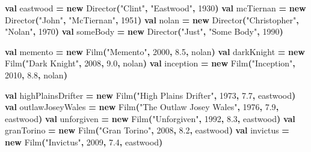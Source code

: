 \documentclass[11pt,a5paper,]{book}
\newenvironment{Shaded}{\begin{snugshade}}{\end{snugshade}}
\newcommand{\DecValTok}[1]{\textcolor[rgb]{0.00,0.00,0.81}{#1}}
\newcommand{\FloatTok}[1]{\textcolor[rgb]{0.00,0.00,0.81}{#1}}
\newcommand{\FunctionTok}[1]{\textcolor[rgb]{0.00,0.00,0.00}{#1}}
\newcommand{\KeywordTok}[1]{\textcolor[rgb]{0.13,0.29,0.53}{\textbf{#1}}}
\newcommand{\NormalTok}[1]{#1}
\newcommand{\OperatorTok}[1]{\textcolor[rgb]{0.81,0.36,0.00}{\textbf{#1}}}
\newcommand{\StringTok}[1]{\textcolor[rgb]{0.31,0.60,0.02}{#1}}
\begin{document}
\begin{Shaded}
\begin{Highlighting}[]
\KeywordTok{val}\NormalTok{ eastwood          }\OperatorTok{=} \KeywordTok{new} \FunctionTok{Director}\OperatorTok{(}\StringTok{"Clint"}\OperatorTok{,} \StringTok{"Eastwood"}\OperatorTok{,} \DecValTok{1930}\OperatorTok{)}
\KeywordTok{val}\NormalTok{ mcTiernan         }\OperatorTok{=} \KeywordTok{new} \FunctionTok{Director}\OperatorTok{(}\StringTok{"John"}\OperatorTok{,} \StringTok{"McTiernan"}\OperatorTok{,} \DecValTok{1951}\OperatorTok{)}
\KeywordTok{val}\NormalTok{ nolan             }\OperatorTok{=} \KeywordTok{new} \FunctionTok{Director}\OperatorTok{(}\StringTok{"Christopher"}\OperatorTok{,} \StringTok{"Nolan"}\OperatorTok{,} \DecValTok{1970}\OperatorTok{)}
\KeywordTok{val}\NormalTok{ someBody          }\OperatorTok{=} \KeywordTok{new} \FunctionTok{Director}\OperatorTok{(}\StringTok{"Just"}\OperatorTok{,} \StringTok{"Some Body"}\OperatorTok{,} \DecValTok{1990}\OperatorTok{)}

\KeywordTok{val}\NormalTok{ memento           }\OperatorTok{=} \KeywordTok{new} \FunctionTok{Film}\OperatorTok{(}\StringTok{"Memento"}\OperatorTok{,} \DecValTok{2000}\OperatorTok{,} \FloatTok{8.5}\OperatorTok{,}\NormalTok{ nolan}\OperatorTok{)}
\KeywordTok{val}\NormalTok{ darkKnight        }\OperatorTok{=} \KeywordTok{new} \FunctionTok{Film}\OperatorTok{(}\StringTok{"Dark Knight"}\OperatorTok{,} \DecValTok{2008}\OperatorTok{,} \FloatTok{9.0}\OperatorTok{,}\NormalTok{ nolan}\OperatorTok{)}
\KeywordTok{val}\NormalTok{ inception         }\OperatorTok{=} \KeywordTok{new} \FunctionTok{Film}\OperatorTok{(}\StringTok{"Inception"}\OperatorTok{,} \DecValTok{2010}\OperatorTok{,} \FloatTok{8.8}\OperatorTok{,}\NormalTok{ nolan}\OperatorTok{)}

\KeywordTok{val}\NormalTok{ highPlainsDrifter }\OperatorTok{=} \KeywordTok{new} \FunctionTok{Film}\OperatorTok{(}\StringTok{"High Plains Drifter"}\OperatorTok{,} \DecValTok{1973}\OperatorTok{,} \FloatTok{7.7}\OperatorTok{,}\NormalTok{ eastwood}\OperatorTok{)}
\KeywordTok{val}\NormalTok{ outlawJoseyWales  }\OperatorTok{=} \KeywordTok{new} \FunctionTok{Film}\OperatorTok{(}\StringTok{"The Outlaw Josey Wales"}\OperatorTok{,} \DecValTok{1976}\OperatorTok{,} \FloatTok{7.9}\OperatorTok{,}\NormalTok{ eastwood}\OperatorTok{)}
\KeywordTok{val}\NormalTok{ unforgiven        }\OperatorTok{=} \KeywordTok{new} \FunctionTok{Film}\OperatorTok{(}\StringTok{"Unforgiven"}\OperatorTok{,} \DecValTok{1992}\OperatorTok{,} \FloatTok{8.3}\OperatorTok{,}\NormalTok{ eastwood}\OperatorTok{)}
\KeywordTok{val}\NormalTok{ granTorino        }\OperatorTok{=} \KeywordTok{new} \FunctionTok{Film}\OperatorTok{(}\StringTok{"Gran Torino"}\OperatorTok{,} \DecValTok{2008}\OperatorTok{,} \FloatTok{8.2}\OperatorTok{,}\NormalTok{ eastwood}\OperatorTok{)}
\KeywordTok{val}\NormalTok{ invictus          }\OperatorTok{=} \KeywordTok{new} \FunctionTok{Film}\OperatorTok{(}\StringTok{"Invictus"}\OperatorTok{,} \DecValTok{2009}\OperatorTok{,} \FloatTok{7.4}\OperatorTok{,}\NormalTok{ eastwood}\OperatorTok{)}


\end{Highlighting}
\end{Shaded}
\end{document}
